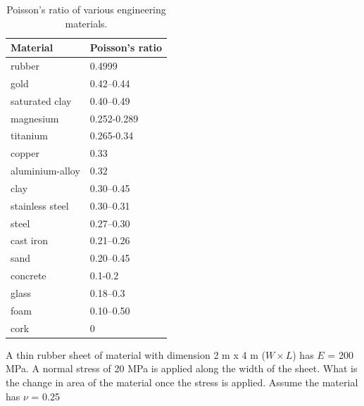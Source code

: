 \documentclass[
10pt,
a4paper,
openany,
svgnames,
]{book} %
\begin{document}
\begin{table}[h]
  \centering
  \caption{Poisson's ratio of various engineering materials.}
  \label{table: poisson's of materials}
  {\renewcommand\arraystretch{1.2}
    \begin{tabular}{ll}
      \toprule
      Material & Poisson's ratio\\
      \midrule
      rubber & 0.4999\\
      gold & 0.42–0.44\\
      saturated clay & 0.40–0.49\\
      magnesium & 0.252-0.289\\
      titanium & 0.265-0.34\\
      copper & 0.33\\
      aluminium-alloy & 0.32\\
      clay & 0.30–0.45\\
      stainless steel & 0.30–0.31\\
      steel & 0.27–0.30\\
      cast iron & 0.21–0.26\\
      sand & 0.20–0.45\\
      concrete & 0.1-0.2\\
      glass & 0.18–0.3\\
      foam & 0.10–0.50\\
      cork & 0\\
      \bottomrule
    \end{tabular}}
\end{table}

\begin{example}
A thin rubber sheet of material with dimension 2 m x 4 m ($W \times L$) has $E$ = 200 MPa. A normal stress of 20 MPa is applied along the width of the sheet. What is the change in area of the material once the stress is applied. Assume the material has $\nu$ = 0.25
\end{example}
\end{document}
